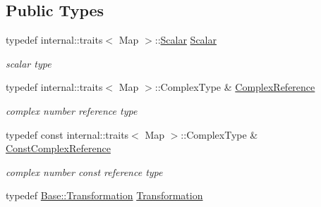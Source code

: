 \subsection*{Public Types}
\begin{DoxyCompactItemize}
\item 
typedef internal\+::traits$<$ Map $>$\+::\hyperlink{class_sophus_1_1_s_o2_group_base_a075b701502715aecf0bdb3464963d36c}{Scalar} \hyperlink{class_eigen_1_1_map_3_01_sophus_1_1_s_o2_group_3_01___scalar_01_4_00_01___options_01_4_ae6b0bc4f4e453419df11bcc15bf88ed8}{Scalar}\hypertarget{class_eigen_1_1_map_3_01_sophus_1_1_s_o2_group_3_01___scalar_01_4_00_01___options_01_4_ae6b0bc4f4e453419df11bcc15bf88ed8}{}\label{class_eigen_1_1_map_3_01_sophus_1_1_s_o2_group_3_01___scalar_01_4_00_01___options_01_4_ae6b0bc4f4e453419df11bcc15bf88ed8}

\begin{DoxyCompactList}\small\item\em scalar type \end{DoxyCompactList}\item 
typedef internal\+::traits$<$ Map $>$\+::Complex\+Type \& \hyperlink{class_eigen_1_1_map_3_01_sophus_1_1_s_o2_group_3_01___scalar_01_4_00_01___options_01_4_ac0a405be5117be77329dbc1498a1000c}{Complex\+Reference}\hypertarget{class_eigen_1_1_map_3_01_sophus_1_1_s_o2_group_3_01___scalar_01_4_00_01___options_01_4_ac0a405be5117be77329dbc1498a1000c}{}\label{class_eigen_1_1_map_3_01_sophus_1_1_s_o2_group_3_01___scalar_01_4_00_01___options_01_4_ac0a405be5117be77329dbc1498a1000c}

\begin{DoxyCompactList}\small\item\em complex number reference type \end{DoxyCompactList}\item 
typedef const internal\+::traits$<$ Map $>$\+::Complex\+Type \& \hyperlink{class_eigen_1_1_map_3_01_sophus_1_1_s_o2_group_3_01___scalar_01_4_00_01___options_01_4_a403f27ed222fae083641a79d9c4629c0}{Const\+Complex\+Reference}\hypertarget{class_eigen_1_1_map_3_01_sophus_1_1_s_o2_group_3_01___scalar_01_4_00_01___options_01_4_a403f27ed222fae083641a79d9c4629c0}{}\label{class_eigen_1_1_map_3_01_sophus_1_1_s_o2_group_3_01___scalar_01_4_00_01___options_01_4_a403f27ed222fae083641a79d9c4629c0}

\begin{DoxyCompactList}\small\item\em complex number const reference type \end{DoxyCompactList}\item 
typedef \hyperlink{class_sophus_1_1_s_o2_group_base_a8981dccaf65802191e989815046b6a82}{Base\+::\+Transformation} \hyperlink{class_eigen_1_1_map_3_01_sophus_1_1_s_o2_group_3_01___scalar_01_4_00_01___options_01_4_ad04ccbc06289dabfca623828588c55d8}{Transformation}\hypertarget{class_eigen_1_1_map_3_01_sophus_1_1_s_o2_group_3_01___scalar_01_4_00_01___options_01_4_ad04ccbc06289dabfca623828588c55d8}{}\label{class_eigen_1_1_map_3_01_sophus_1_1_s_o2_group_3_01___scalar_01_4_00_01___options_01_4_ad04ccbc06289dabfca623828588c55d8}


\end{DoxyCompactItemize}

